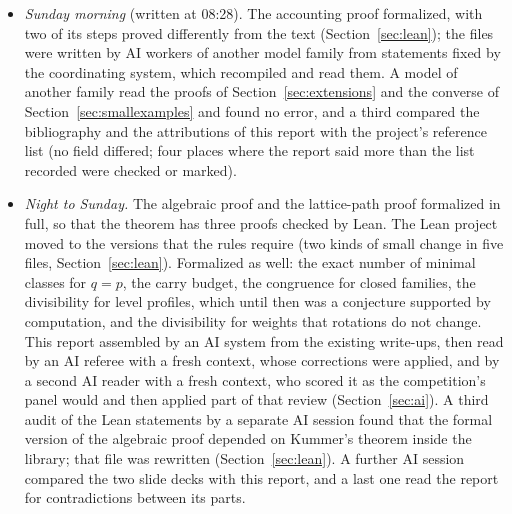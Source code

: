 \documentclass[11pt]{article}
\theoremstyle{definition}
\theoremstyle{remark}
\numberwithin{equation}{section}
\numberwithin{figure}{section}
\begin{document}
\begin{itemize}[itemsep=1pt]
 and had read the accounting proof.
\item \emph{Sunday morning} (written at 08:28). The accounting proof formalized, with two of its steps
 proved differently from the text (Section~\ref{sec:lean}); the files were written by AI workers of another
 model family from statements fixed by the coordinating system, which recompiled and read them. A model of
 another family read the proofs of Section~\ref{sec:extensions} and the converse of
 Section~\ref{sec:smallexamples} and found no error, and a third compared the bibliography and the
 attributions of this report with the project's reference list (no field differed; four places where the
 report said more than the list recorded were checked or marked).
\item \emph{Night to Sunday.} The algebraic proof and the lattice-path proof formalized in full, so that the
 theorem has three proofs checked by Lean. The Lean project moved to the versions that the rules require
 (two kinds of small change in five files, Section~\ref{sec:lean}). Formalized as well: the exact number of minimal classes for $q=p$, the carry budget,
 the congruence for closed families, the divisibility for level profiles, which until then was a
 conjecture supported by computation, and the divisibility for weights that rotations do not change. This
 report assembled by an AI system from the existing write-ups, then read by an AI referee with a fresh
 context, whose corrections were applied, and by a second AI reader with a fresh context, who scored it as the
 competition's panel would and then applied part of that review (Section~\ref{sec:ai}). A third audit of the
 Lean statements by a separate AI session found that the formal version of the algebraic proof depended on
 Kummer's theorem inside the library; that file was rewritten (Section~\ref{sec:lean}). A further AI session
 compared the two slide decks with this report, and a last one read the report for contradictions between
 its parts.
\end{itemize}
\end{document}

